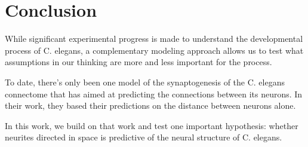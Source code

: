\section{Conclusion}

While significant experimental progress is made to understand the developmental process of C. elegans, a complementary modeling approach allows us to test what assumptions in our thinking are more and less important for the process. 

To date, there’s only been one model of the synaptogenesis of the C. elegans connectome that has aimed at predicting the connections between its neurons. In their work, they based their predictions on the distance between neurons alone. 

In this work, we build on that work and test one important hypothesis: whether neurites directed in space is predictive of the neural structure of C. elegans.
